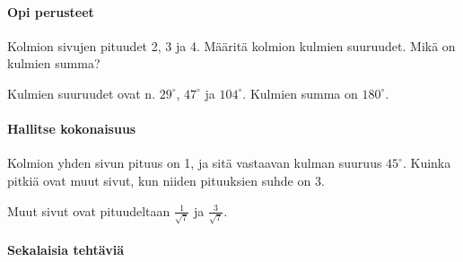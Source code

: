 \begin{tehtavasivu}

\paragraph*{Opi perusteet}

\begin{tehtava}
Kolmion sivujen pituudet 2, 3 ja 4. Määritä kolmion kulmien suuruudet. Mikä on kulmien summa?
\begin{vastaus}
Kulmien suuruudet ovat n. $29^\circ$, $47^\circ$ ja $104^\circ$. Kulmien summa on $180^\circ$.
\end{vastaus}
\end{tehtava}

\paragraph*{Hallitse kokonaisuus}

\begin{tehtava}
Kolmion yhden sivun pituus on 1, ja sitä vastaavan kulman suuruus $45^\circ$. Kuinka pitkiä ovat muut sivut, kun niiden pituuksien suhde on 3.

\begin{vastaus}
Muut sivut ovat pituudeltaan $\frac{1}{\sqrt{7}}$ ja $\frac{3}{\sqrt{7}}$.
\end{vastaus}
\end{tehtava}

\paragraph*{Sekalaisia tehtäviä}

\end{tehtavasivu}
